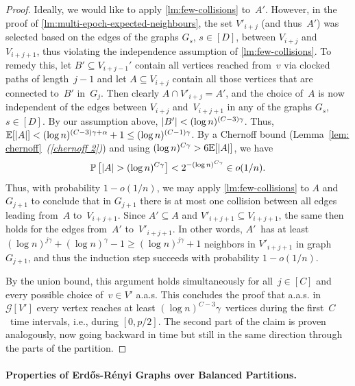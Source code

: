 \documentclass[a4paper,11pt]{article}
\makeatletter
\theoremstyle{definition}
\theoremstyle{plain}
\newcommand{\GGG}{\mathcal{G}}
\newcommand{\prob}{\mathbb{P}}
\newcommand{\expect}{\mathbb{E}}
\newcommand{\aas}{a.a.s.\@\xspace}
\DeclarePairedDelimiter{\abs}{\lvert}{\rvert}
\newcommand{\Erdos}{Erd\H{o}s}
\newcommand{\Renyi}{R\'enyi}
\newcommand{\ER}{\Erdos-\Renyi}
\makeatother
\begin{document}
\begin{proof}
	Ideally, we would like to apply \cref{lm:few-collisions} to~$A'$.
	However, in the proof of \cref{lm:multi-epoch-expected-neighbours}, the set $V'_{i+j}$ (and thus~$A'$) was selected based on the edges of the graphs $G_s$, $s \in [D]$, between $V_{i+j}$ and~$V_{i+j+1}$, thus violating the independence assumption of \cref{lm:few-collisions}.
	To remedy this, let $B' \subseteq V_{i+j-1}'$ contain all vertices reached from~$v$ via clocked paths of length~$j-1$ and let $A \subseteq V_{i+j}$ contain all those vertices that are connected to~$B'$ in~$G_j$.
	Then clearly $A \cap V'_{i+j} = A'$, and the choice of~$A$ is now independent of the edges between $V_{i+j}$ and~$V_{i+j+1}$ in any of the graphs $G_s$, $s \in [D]$.
	By our assumption above, $\abs{B'} < (\log n)^{(C-3)\gamma}$.
	Thus, $\expect[\abs{A}] < (\log n)^{(C-3)\gamma + \alpha} + 1 \leq (\log n)^{(C-1)\gamma}$.
  By a Chernoff bound (Lemma~\ref{lem: chernoff}~\emph{(\ref{chernoff 2})}) and using $(\log n)^{C\gamma} > 6\expect[\abs{A}]$, we have
	\[
	\prob\left[\abs{A} > (\log n)^{C \gamma}\right] < 2^{-(\log n)^{C \gamma}} \in o(1/n).
	\]
	Thus, with probability $1-o(1/n)$, we may apply \cref{lm:few-collisions} to $A$ and $G_{j+1}$ to conclude that in $G_{j+1}$ there is at most one collision between all edges leading from~$A$ to~$V_{i+j+1}$.
	Since $A' \subseteq A$ and $V'_{i+j+1} \subseteq V_{i+j+1}$, the same then holds for the edges from~$A'$ to~$V'_{i+j+1}$.
	In other words, $A'$~has at least $(\log n)^{j\gamma}+(\log n)^\gamma -1 \geq (\log n)^{j\gamma} +1$ neighbors in $V'_{i+j+1}$ in graph $G_{j+1}$, and thus the induction step succeeds with probability $1-o(1/n)$.
	
	By the union bound, this argument holds simultaneously for all~$j \in [C]$ and every possible choice of~$v \in V'$ a.a.s.
	This concludes the proof that \aas in $\GGG[V']$ every vertex reaches at least $(\log n)^{C-3}\gamma$~vertices during the first~$C$~time intervals, i.e., during $[0,p/2]$.
	The second part of the claim is proven analogously, now going backward in time but still in the same direction through the parts of the partition.
\end{proof}



\paragraph*{Properties of \ER{} Graphs over Balanced Partitions.}
\label{sec:ERparatition}
\end{document}
